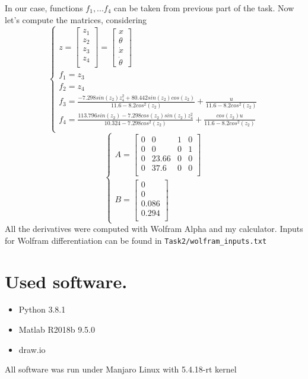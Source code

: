 \documentclass[a4paper,12pt]{article}
\begin{document}
    In our case, functions $f_1, ... f_4$ can be taken from previous part of the
    task. Now let's compute the matrices, considering
    \begin{equation}
        \begin{cases}
        z = 
        \begin{bmatrix}
            z_1\\
            z_2\\
            z_3\\
            z_4\\
        \end{bmatrix} = 
        \begin{bmatrix}
            x\\
            \theta\\
            \dot x\\
            \dot \theta    
        \end{bmatrix}\\
        f_1 = z_3\\
        f_2 = z_4\\
        f_3 = \frac
        {- 7.298sin(z_2)z_4^2 + 80.442sin(z_2)cos(z_2)}
        {11.6 - 8.2cos^2(z_2)}
        +
        \frac{u}
        {11.6 - 8.2cos^2(z_2)}
        \\
        f_4 = \frac
        {113.796sin(z_2) - 7.298cos(z_2)sin(z_2)z_4^2}
        {10.324 - 7.298cos^2(z_2)}
        +
        \frac{cos(z_2)u}
        {11.6 - 8.2cos^2(z_2)}\\
        \end{cases}
    \end{equation}
    \begin{equation}
        \begin{cases}
            A=
            \begin{bmatrix}
                0 & 0 & 1 & 0 \\
                0 & 0 & 0 & 1 \\
                0 & 23.66 & 0 & 0\\
                0 & 37.6  & 0 & 0\\
            \end{bmatrix}\\
            B=
            \begin{bmatrix}
                0 \\
                0 \\
                0.086 \\
                0.294 \\
            \end{bmatrix}
        \end{cases}
    \end{equation}
    All the derivatives were computed with Wolfram Alpha and my calculator.
    Inputs for Wolfram differentiation can be found in \texttt{Task2/wolfram\_inputs.txt}
\section{Used software.}
\begin{itemize}
    \item Python 3.8.1
    \item Matlab R2018b 9.5.0
    \item draw.io
\end{itemize}
All software was run under Manjaro Linux with 5.4.18-rt kernel
\end{document}
